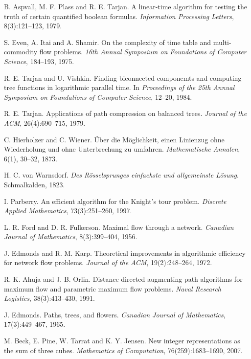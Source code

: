 \begin{thebibliography}{9}
    B. Aspvall, M. F. Plass and R. E. Tarjan.
    A linear-time algorithm for testing the truth of certain quantified boolean formulas.
    \emph{Information Processing Letters}, 8(3):121--123, 1979.
  
    S. Even, A. Itai and A. Shamir.
    On the complexity of time table and multi-commodity flow problems.
    \emph{16th Annual Symposium on Foundations of Computer Science}, 184--193, 1975.
  
    R. E. Tarjan and U. Vishkin.
    Finding biconnected componemts and computing tree functions in logarithmic parallel time.
    In \emph{Proceedings of the 25th Annual Symposium on Foundations of Computer Science}, 12--20, 1984.
  
    R. E. Tarjan.
    Applications of path compression on balanced trees.
    \emph{Journal of the ACM}, 26(4):690--715, 1979.
  
    C. Hierholzer and C. Wiener.
    Über die Möglichkeit, einen Linienzug ohne Wiederholung und ohne Unterbrechung zu umfahren.
    \emph{Mathematische Annalen}, 6(1), 30--32, 1873.
  
    H. C. von Warnsdorf.
    \emph{Des Rösselsprunges einfachste und allgemeinste Lösung}.
    Schmalkalden, 1823.
  
    I. Parberry.
    An efficient algorithm for the Knight's tour problem.
    \emph{Discrete Applied Mathematics}, 73(3):251--260, 1997.
  
    L. R. Ford and D. R. Fulkerson.
    Maximal flow through a network.
    \emph{Canadian Journal of Mathematics}, 8(3):399--404, 1956.
  
    J. Edmonds and R. M. Karp.
    Theoretical improvements in algorithmic efficiency for network flow problems.
    \emph{Journal of the ACM}, 19(2):248--264, 1972.
  
    R. K. Ahuja and J. B. Orlin.
    Distance directed augmenting path algorithms for maximum flow and parametric maximum flow problems.
    \emph{Naval Research Logistics}, 38(3):413--430, 1991.
  
    J. Edmonds.
    Paths, trees, and flowers.
    \emph{Canadian Journal of Mathematics}, 17(3):449--467, 1965.
  
    M. Beck, E. Pine, W. Tarrat and K. Y. Jensen.
    New integer representations as the sum of three cubes.
    \emph{Mathematics of Computation}, 76(259):1683--1690, 2007.
  

\end{thebibliography}
